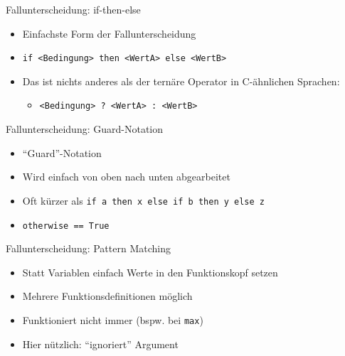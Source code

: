 \documentclass{beamer}
\begin{document}
\begin{frame}{Fallunterscheidung: if-then-else}

        \begin{itemize}
                \item Einfachste Form der Fallunterscheidung
                \item \texttt{if <Bedingung> then <WertA> else <WertB>}
                \pause
                \item Das ist nichts anderes als der ternäre Operator in C-ähnlichen Sprachen:
                \begin{itemize}
                        \item \texttt{<Bedingung> ? <WertA> : <WertB>}
                \end{itemize}
        \end{itemize}
\end{frame}

\begin{frame}{Fallunterscheidung: Guard-Notation}

        \begin{itemize}
                \item \enquote{Guard}-Notation
                \item Wird einfach von oben nach unten abgearbeitet
                \item Oft kürzer als \texttt{if a then x else if b then y else z}
                \pause
                \item \texttt{otherwise == True}
        \end{itemize}
\end{frame}

\begin{frame}{Fallunterscheidung: Pattern Matching}

        \begin{itemize}
                \item Statt Variablen einfach Werte in den Funktionskopf setzen
                \item Mehrere Funktionsdefinitionen möglich
                \item Funktioniert nicht immer (bspw. bei \texttt{max})
                \item Hier nützlich: \texttt{\textunderscore} \enquote{ignoriert} Argument
        \end{itemize}
\end{frame}
\end{document}
